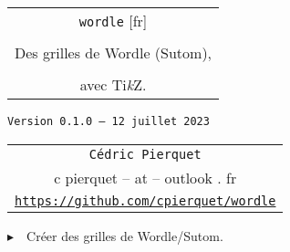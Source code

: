 \documentclass[french,a4paper,11pt]{article}
\def\TPversion{0.1.0}
\def\TPdate{12 juillet 2023}
\begin{document}
\setlength{\aweboxleftmargin}{0.07\linewidth}
\setlength{\aweboxcontentwidth}{0.93\linewidth}
\setlength{\aweboxvskip}{8pt}

\pagestyle{fancy}

\thispagestyle{empty}

\vspace{2cm}

\begin{center}
	\begin{minipage}{0.75\linewidth}
	\begin{tcolorbox}[colframe=yellow,colback=yellow!15]
		\begin{center}
			\begin{tabular}{c}
				{\Huge \texttt{wordle} [fr]}\\
				\\
				{\LARGE Des grilles de Wordle (Sutom),} \\
				\\
				{\LARGE avec \textsf{Ti\textit{k}Z}.} \\
			\end{tabular}
			
			\bigskip
			
			{\small \texttt{Version \TPversion{} -- \TPdate}}
		\end{center}
	\end{tcolorbox}
\end{minipage}
\end{center}

\begin{center}
	\begin{tabular}{c}
	\texttt{Cédric Pierquet}\\
	{\ttfamily c pierquet -- at -- outlook . fr}\\
	\texttt{\url{https://github.com/cpierquet/wordle}}
\end{tabular}
\end{center}

\vspace{0.25cm}

{$\blacktriangleright$~~Créer des grilles de Wordle/Sutom\footnotemark{}.}

\vspace{0.25cm}
\end{document}
